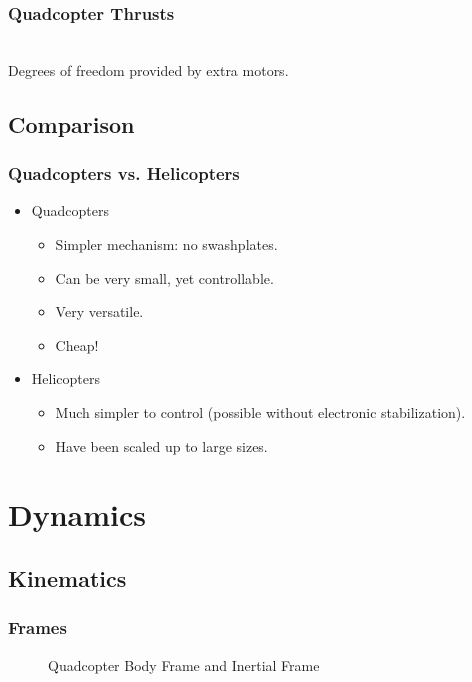 \documentclass{beamer}
\begin{document}
\begin{frame}
    \frametitle{Quadcopter Thrusts}
    \begin{center}
         \\
        Degrees of freedom provided by extra motors.
    \end{center}
\end{frame}

\subsection{Comparison}
\begin{frame}
    \frametitle{Quadcopters vs. Helicopters}
    \begin{itemize}
        \item
            Quadcopters
            \begin{itemize}
                \item Simpler mechanism: no swashplates.
                \item Can be very small, yet controllable.
                \item Very versatile.
                \item Cheap!
            \end{itemize}
        \item
            Helicopters
            \begin{itemize}
                \item Much simpler to control (possible without electronic stabilization).
                \item Have been scaled up to large sizes.
            \end{itemize}
    \end{itemize}
\end{frame}

\section{Dynamics}
\subsection{Kinematics}
\begin{frame}
    \frametitle{Frames}
    \begin{figure}[h]
        \caption{Quadcopter Body Frame and Inertial Frame}
    \end{figure}
\end{frame}
\end{document}
